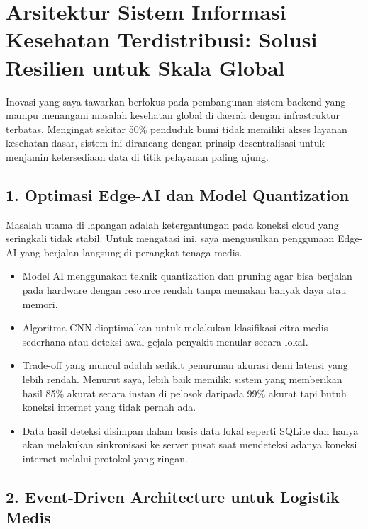 \documentclass[
  letterpaper,
  DIV=11,
  numbers=noendperiod]{scrreprt}
\begin{document}
\section{Arsitektur Sistem Informasi Kesehatan Terdistribusi: Solusi
Resilien untuk Skala
Global}\label{arsitektur-sistem-informasi-kesehatan-terdistribusi-solusi-resilien-untuk-skala-global}

Inovasi yang saya tawarkan berfokus pada pembangunan sistem backend yang
mampu menangani masalah kesehatan global di daerah dengan infrastruktur
terbatas. Mengingat sekitar 50\% penduduk bumi tidak memiliki akses
layanan kesehatan dasar, sistem ini dirancang dengan prinsip
desentralisasi untuk menjamin ketersediaan data di titik pelayanan
paling ujung.

\subsection{1. Optimasi Edge-AI dan Model
Quantization}\label{optimasi-edge-ai-dan-model-quantization}

Masalah utama di lapangan adalah ketergantungan pada koneksi cloud yang
seringkali tidak stabil. Untuk mengatasi ini, saya mengusulkan
penggunaan Edge-AI yang berjalan langsung di perangkat tenaga medis.

\begin{itemize}
\item
  Model AI menggunakan teknik quantization dan pruning agar bisa
  berjalan pada hardware dengan resource rendah tanpa memakan banyak
  daya atau memori.
\item
  Algoritma CNN dioptimalkan untuk melakukan klasifikasi citra medis
  sederhana atau deteksi awal gejala penyakit menular secara lokal.
\item
  Trade-off yang muncul adalah sedikit penurunan akurasi demi latensi
  yang lebih rendah. Menurut saya, lebih baik memiliki sistem yang
  memberikan hasil 85\% akurat secara instan di pelosok daripada 99\%
  akurat tapi butuh koneksi internet yang tidak pernah ada.
\item
  Data hasil deteksi disimpan dalam basis data lokal seperti SQLite dan
  hanya akan melakukan sinkronisasi ke server pusat saat mendeteksi
  adanya koneksi internet melalui protokol yang ringan.
\end{itemize}

\subsection{2. Event-Driven Architecture untuk Logistik
Medis}\label{event-driven-architecture-untuk-logistik-medis}
\end{document}
